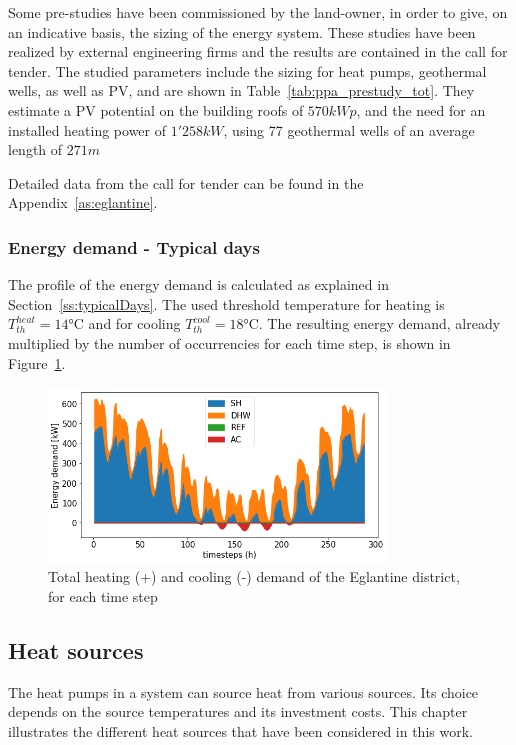 \documentclass{article}
\begin{document}
Some pre-studies have been commissioned by the land-owner, in order to give, on an indicative basis, the sizing of the energy system. These studies have been realized by external engineering firms and the results are contained in the call for tender. The studied parameters include the sizing for heat pumps, geothermal wells, as well as PV, and are shown in Table~\ref{tab:ppa_prestudy_tot}. They estimate a PV potential on the building roofs of $570 kWp$, and the need for an installed heating power of $1'258 kW$, using 77 geothermal wells of an average length of $271 m$



Detailed data from the call for tender can be found in the Appendix~\ref{as:eglantine}.

\subsubsection{Energy demand - Typical days}
The profile of the energy demand is calculated as explained in Section~\ref{ss:typicalDays}. The used threshold temperature for heating is $T_{th}^{heat} = 14\si{\celsius}$ and for cooling $T_{th}^{cool} = 18 \si{\celsius}$. The resulting energy demand, already multiplied by the number of occurrencies for each time step, is shown in Figure~\ref{fig:energyDemand}.

\begin{figure}[h!]
	\centering
	\includegraphics[width=0.8\textwidth]{energy_demand.png}
	\caption{Total heating (+) and cooling (-) demand of the Eglantine district, for each time step}
	\label{fig:energyDemand}
\end{figure}


\subsection{Heat sources}
The heat pumps in a system can source heat from various sources. Its choice depends on the source temperatures and its investment costs. This chapter illustrates the different heat sources that have been considered in this work.
\end{document}
